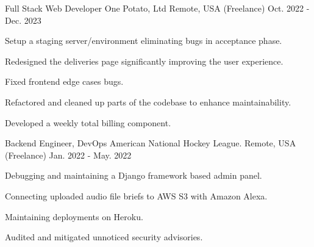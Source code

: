 \begin{cventries}
  \cventry
    {Full Stack Web Developer} %
    {One Potato, Ltd} %
    {Remote, USA (Freelance)} %
    {Oct. 2022 - Dec. 2023} %
    {
      \begin{cvitems} %
        \item {Setup a staging server/environment eliminating bugs in acceptance phase.}
        \item {Redesigned the deliveries page significantly improving the user experience.}
        \item {Fixed frontend edge cases bugs.}
        \item {Refactored and cleaned up parts of the codebase to enhance maintainability.}
        \item {Developed a weekly total billing component.}
      \end{cvitems}
    }

  \cventry
    {Backend Engineer, DevOps} %
    {American National Hockey League.} %
    {Remote, USA (Freelance)} %
    {Jan. 2022 - May. 2022} %
    {
      \begin{cvitems} %
        \item {Debugging and maintaining a Django framework based admin panel.}
        \item {Connecting uploaded audio file briefs to AWS S3 with Amazon Alexa.}
        \item {Maintaining deployments on Heroku.}
        \item {Audited and mitigated unnoticed security advisories.}
      \end{cvitems}
    }


\end{cventries}
